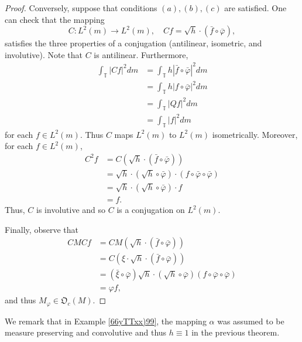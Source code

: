 \documentclass{dis}
\theoremstyle{plain}
\theoremstyle{definition}
\def\T{\mathbb{T}}
\renewcommand{\phi}{\varphi}
\newcommand{\0}{{\color{lightgray}0}}
\begin{document}
\begin{proof}
Conversely, suppose that conditions $(a), (b), (c)$ are satisfied. One can check that  the mapping 
$$C: L^2(m) \to L^2(m), \quad C f = \sqrt{h} \cdot (\bar f \circ \bar \phi),$$
satisfies the three properties of a conjugation (antilinear, isometric, and involutive). Note that  $C$ is antilinear. Furthermore,  
\begin{align*}
\int_{\T} |C f|^2 dm & = \int_{\T} h |\bar f \circ \bar \phi|^2 dm\\
& = \int_{\T} h |f \circ \bar \phi|^2 dm\\
& = \int_{\T} |Q f|^2 dm\\
& = \int_{\T} |f|^2 dm
\end{align*}
for each $f \in L^2(m)$. 
Thus $C$ maps $L^2(m)$ to $L^2(m)$ isometrically.  Moreover, for each $f \in L^2(m)$,
\begin{align*}
C^2 f & = C (\sqrt{h} \cdot (\bar f \circ \bar \phi))\\
& = \sqrt{h} \cdot (\sqrt{h} \circ \bar \phi) \cdot (f \circ \bar \phi \circ \bar \phi)\\
& = \sqrt{h} \cdot (\sqrt{h} \circ \bar \phi )\cdot f\\
& = f. 
\end{align*}
Thus, $C$ is involutive and so $C$ is a conjugation on $L^2(m)$. 

Finally, observe that 
\begin{align*}
C M C f & = C M  (\sqrt{h} \cdot (\bar f \circ \bar\phi))\\
& = C (\xi \cdot \sqrt{h} \cdot (\bar f \circ \bar \phi))\\
& = (\bar  \xi \circ \bar \phi) \sqrt{h} \cdot (\sqrt{h} \circ \bar \phi) (f \circ \bar \phi \circ \bar \phi)\\
& = \phi f,
\end{align*}
and thus $M_{\phi} \in \mathfrak{O}_c(M)$. 
\end{proof}

We remark that in Example \ref{66yTTxx)99}, the mapping $\alpha$ was assumed to be measure preserving and convolutive and thus $h \equiv 1$ in the previous theorem. 
\end{document}
